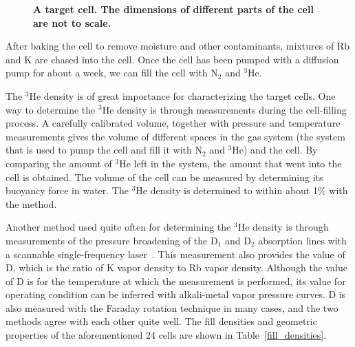 \begin{figure}[H]
	\centering
	\caption{{\bf A target cell. The dimensions of different parts of the cell are not to scale.}}
	\label{TargetCell}
\end{figure}

After baking the cell to remove moisture and other contaminants, mixtures of Rb and K are chased into the cell. Once the cell has been pumped with a diffusion pump for about a week, we can fill the cell with N$_{2}$ and $^{3}$He. 

The $^{3}$He density is of great importance for characterizing the target cells. One way to determine the $^{3}$He density is through measurements during the cell-filling process. A carefully calibrated volume, together with pressure and temperature measurements gives the volume of different spaces in the gas system (the system that is used to pump the cell and fill it with N$_{2}$ and $^{3}$He) and the cell. By comparing the amount of $^{3}$He left in the system, the amount that went into the cell is obtained. The volume of the cell can be measured by determining its buoyancy force in water. The $^{3}$He density is determined to within about 1\% with the method.

Another method used quite often for determining the $^{3}$He density is through measurements of the pressure broadening of the D$_{1}$ and D$_{2}$ absorption lines with a scannable single-frequency laser~\cite{Romalis1997}. This measurement also provides the value of D, which is the ratio of K vapor density to Rb vapor density. Although the value of D is for the temperature at which the measurement is performed, its value for operating condition can be inferred with alkali-metal vapor pressure curves. D is also measured with the Faraday rotation technique in many cases, and the two methods agree with each other quite well. The fill densities and geometric properties of the aforementioned 24 cells are shown in Table~\ref{fill_densities}.

